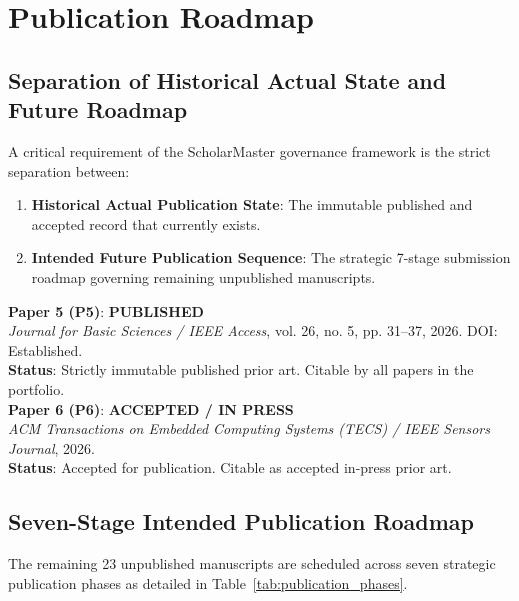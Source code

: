 \documentclass[11pt,letterpaper]{article}
\begin{document}
\section{Publication Roadmap}

\subsection{Separation of Historical Actual State and Future Roadmap}
A critical requirement of the ScholarMaster governance framework is the strict separation between:
\begin{enumerate}
    \item \textbf{Historical Actual Publication State}: The immutable published and accepted record that currently exists.
    \item \textbf{Intended Future Publication Sequence}: The strategic 7-stage submission roadmap governing remaining unpublished manuscripts.
\end{enumerate}

\begin{tcolorbox}[colback=green!5!white,colframe=green!60!black,title=Historical Actual State (Ground Truth)]
\textbf{Paper 5 (P5)}: \textbf{PUBLISHED}\\
\textit{Journal for Basic Sciences / IEEE Access}, vol. 26, no. 5, pp. 31--37, 2026. DOI: Established.\\
\textbf{Status}: Strictly immutable published prior art. Citable by all papers in the portfolio.\\
\vspace{0.2cm}
\textbf{Paper 6 (P6)}: \textbf{ACCEPTED / IN PRESS}\\
\textit{ACM Transactions on Embedded Computing Systems (TECS) / IEEE Sensors Journal}, 2026.\\
\textbf{Status}: Accepted for publication. Citable as accepted in-press prior art.
\end{tcolorbox}

\subsection{Seven-Stage Intended Publication Roadmap}
The remaining 23 unpublished manuscripts are scheduled across seven strategic publication phases as detailed in Table~\ref{tab:publication_phases}.
\end{document}
